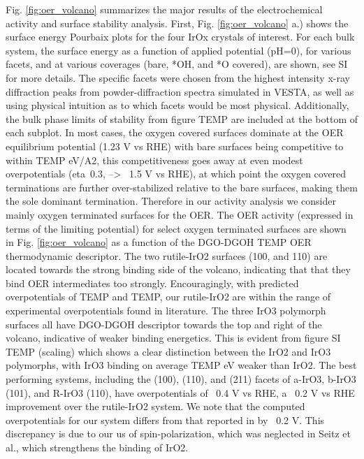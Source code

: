 Fig. \ref{fig:oer_volcano} summarizes the major results of the electrochemical activity and surface stability analysis.
%
First, Fig. \ref{fig:oer_volcano} a.) shows the surface energy Pourbaix plots for the four IrOx crystals of interest. For each bulk system, the surface energy as a function of applied potential (pH=0), for various facets, and at various coverages (bare, *OH, and *O covered), are shown, see SI for more details.
The specific facets were chosen from the highest intensity x-ray diffraction peaks from powder-diffraction spectra simulated in VESTA,
as well as using physical intuition as to which facets would be most physical.
Additionally, the bulk phase limits of stability from figure TEMP are included at the bottom of each subplot.
%
In most cases, the oxygen covered surfaces dominate at the OER equilibrium potential (1.23 V vs RHE) with bare surfaces being competitive to within TEMP eV/A2,
this competitiveness goes away at even modest overpotentials (eta~0.3, --> ~1.5 V vs RHE),
at which point the oxygen covered terminations are further over-stabilized relative to the bare surfaces,
making them the sole dominant termination.
Therefore in our activity analysis we consider mainly oxygen terminated surfaces for the OER.
%
The OER activity (expressed in terms of the limiting potential) for select oxygen terminated surfaces are shown in Fig. \ref{fig:oer_volcano} as a function of the DGO-DGOH TEMP OER thermodynamic descriptor.
%
The two rutile-IrO2 surfaces (100, and 110) are located towards the strong binding side of the volcano, indicating that that they bind OER intermediates too strongly.
Encouragingly, with predicted overpotentials of TEMP and TEMP, our rutile-IrO2 are within the range of experimental overpotentials found in literature.
%
The three IrO3 polymorph surfaces all have DGO-DGOH descriptor towards the top and right of the volcano, indicative of weaker binding energetics.
%
This is evident from figure SI TEMP (scaling) which shows a clear distinction between the IrO2 and IrO3 polymorphs, with IrO3 binding on average TEMP eV weaker than IrO2.
%
The best performing systems, including the (100), (110), and (211) facets of a-IrO3, b-IrO3 (101), and R-IrO3 (110), have overpotentials of ~0.4 V vs RHE,
a ~0.2 V vs RHE improvement over the rutile-IrO2 system.
%
We note that the computed  overpotentials for our \rIrOtwo system differs from that reported in \cite{Seitz2016} by ~0.2 V. This discrepancy is due to our us of spin-polarization, which was neglected in Seitz et al., which strengthens the binding of IrO2.


